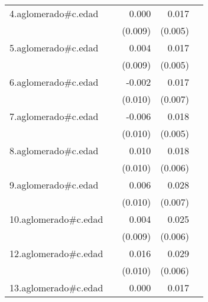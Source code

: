 {\begin{longtable}{l*{4}{D{.}{.}{-1}}}
\addlinespace
4.aglomerado#c.edad&                     &       0.000         &       0.017\sym{**} &                     \\
            &                     &     (0.009)         &     (0.005)         &                     \\
\addlinespace
5.aglomerado#c.edad&                     &       0.004         &       0.017\sym{***}&                     \\
            &                     &     (0.009)         &     (0.005)         &                     \\
\addlinespace
6.aglomerado#c.edad&                     &      -0.002         &       0.017\sym{*}  &                     \\
            &                     &     (0.010)         &     (0.007)         &                     \\
\addlinespace
7.aglomerado#c.edad&                     &      -0.006         &       0.018\sym{***}&                     \\
            &                     &     (0.010)         &     (0.005)         &                     \\
\addlinespace
8.aglomerado#c.edad&                     &       0.010         &       0.018\sym{**} &                     \\
            &                     &     (0.010)         &     (0.006)         &                     \\
\addlinespace
9.aglomerado#c.edad&                     &       0.006         &       0.028\sym{***}&                     \\
            &                     &     (0.010)         &     (0.007)         &                     \\
\addlinespace
10.aglomerado#c.edad&                     &       0.004         &       0.025\sym{***}&                     \\
            &                     &     (0.009)         &     (0.006)         &                     \\
\addlinespace
12.aglomerado#c.edad&                     &       0.016         &       0.029\sym{***}&                     \\
            &                     &     (0.010)         &     (0.006)         &                     \\
\addlinespace
13.aglomerado#c.edad&                     &       0.000         &       0.017\sym{***}&                     \\

\end{longtable}}
